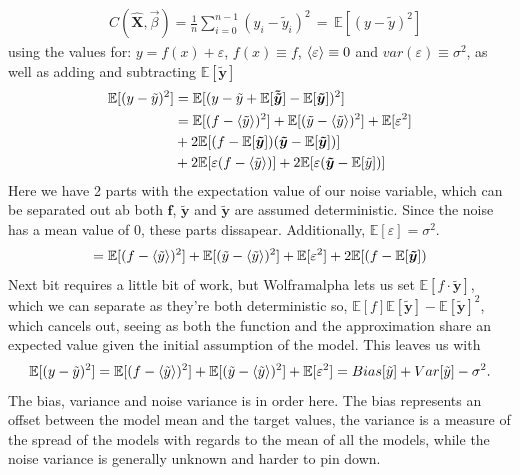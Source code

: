 \documentclass[15pt comic sans]{revtex4-2}
\begin{document}
\begin{align}
    & C(\mathbf{\hat{X}}, \vec{\beta}) 
		 = \frac{1}{n} \sum_{i=0}^{n-1}(y_i - \tilde{y}_i)^2
		 \,=\, \mathbb{E}[(y- \tilde{y})^2]
\end{align}
using the values for: $y = f(x) + \varepsilon$, $f(x) \equiv f$, 
$\ev{\varepsilon} \equiv 0$ and $var(\varepsilon)\equiv \sigma^2$, as well as adding and
subtracting $\mathbb{E}[\bm{\tilde{y}}]$
\begin{align}
	\mathbb{E}[(y- \tilde{y})^2] 
	&	= \mathbb{E}[(y - \tilde{y} + \mathbb{E}[\bm{\tilde{\tilde{y}}}] 
		- \mathbb{E}[\bm{\tilde{y}}])^2] \nonumber \\
	&= \mathbb{E}[(f-\ev{\tilde{y}})^2] 
	+ \mathbb{E}[(\tilde{y} - \ev{\tilde{y}})^2] 
	+ \mathbb{E}[\varepsilon^2] \nonumber\\
	&+ 2\mathbb{E}[(f-\mathbb{E}[\bm{\tilde{y}}])(\bm{\tilde{y}} 
		- \mathbb{E}[\bm{\tilde{y}}])] \nonumber\\
	&+ 2\mathbb{E}[\varepsilon(f-\ev{\tilde{y}})] 
	+ 2\mathbb{E}[\varepsilon(\bm{\tilde{y}} - \mathbb{E}[\tilde{y}])]
\end{align}
Here we have 2 parts with the expectation value of our noise variable, which can be 
separated out ab both $\bm{f}$, $\bm{\tilde{y}}$ and $\bm{\tilde{y}}$ are assumed
deterministic. Since the noise has a mean value of $0$, these parts dissapear. 
Additionally, $\mathbb{E}[\varepsilon]=\sigma^2$.
\begin{align}
	= \mathbb{E}[(f-\ev{\tilde{y}})^2] 
	+ \mathbb{E}[(\tilde{y} - \ev{\tilde{y}})^2] 
	+ \mathbb{E}[\varepsilon^2]
	+ 2\mathbb{E}[(f-\mathbb{E}[\bm{\tilde{y}}])
\end{align}
Next bit requires a little bit of work, but 
Wolframalpha\cite{wolframalpha2020expval} lets us set 
$\mathbb{E}[f\cdot\bm{\tilde{y}}]$, which we can separate as they're both deterministic
so, $ \mathbb{E}[f]\mathbb{E}[\bm{\tilde{y}}] - \mathbb{E}[\bm{\tilde{y}}]^2 $, which
cancels out, seeing as both the function and the approximation share an expected value
given the initial assumption of the model. This leaves us with 
\begin{align}
	\mathbb{E}[(y- \tilde{y})^2] 
	= \mathbb{E}[(f-\ev{\tilde{y}})^2] 
	+ \mathbb{E}[(\tilde{y} - \ev{\tilde{y}})^2] 
	+ \mathbb{E}[\varepsilon^2]
     = Bias[\tilde{y}] + Var[\tilde{y}] - \sigma^2.
\end{align}
The bias, variance and noise variance is in order here. The bias represents an offset
between the model mean and the target values, the variance is a measure of the spread of
the models with regards to the mean of all the models, while the noise variance is 
generally unknown and harder to pin down. 
\end{document}
